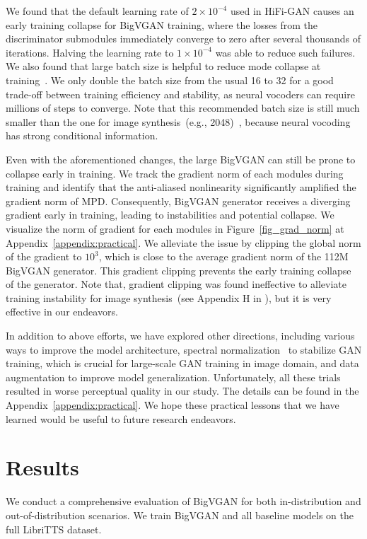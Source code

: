 \documentclass{article} \usepackage{iclr2023_conference,times}
\theoremstyle{plain}
\theoremstyle{definition}
\theoremstyle{remark}
\begin{document}
We found that the default learning rate of $2\times10^{-4}$ used in HiFi-GAN causes an early training collapse for BigVGAN training, where the losses from the discriminator submodules immediately converge to zero after several thousands of iterations. Halving the learning rate to $1\times10^{-4}$ was able to reduce such failures. 
We also found that large batch size is helpful to reduce mode collapse at training~\citep{brock2018large}. We only double the batch size from the usual 16 to 32 for a good trade-off between training efficiency and stability, as neural vocoders can require millions of steps to converge. Note that this recommended batch size is still much smaller than the one for image synthesis~(e.g., 2048)~\citep{brock2018large}, because neural vocoding has strong conditional information.

Even with the aforementioned changes, the large BigVGAN can still be prone to collapse early in training. We track the gradient norm of each modules during training and identify that the anti-aliased nonlinearity significantly amplified the gradient norm of MPD. Consequently, BigVGAN generator receives a diverging gradient early in training, leading to instabilities and potential collapse. We visualize the norm of gradient for each modules in Figure~\ref{fig_grad_norm} at Appendix~\ref{appendix:practical}. We alleviate the issue by clipping the global norm of the gradient to $10^{3}$, which is close to the average gradient norm of the 112M BigVGAN generator. This gradient clipping prevents the early training collapse of the generator. Note that, gradient clipping was found ineffective to alleviate training instability for image synthesis~(see Appendix H in \citet{brock2018large}), but it is very effective in our endeavors.


In addition to above efforts, we have explored other directions, including various ways to improve the model architecture,  spectral normalization~\citep{miyato2018spectral} to stabilize GAN training, which is crucial for large-scale GAN training in image domain, and data augmentation to improve model generalization. Unfortunately, all these trials resulted in worse perceptual quality in our study. The details can be found in the Appendix~\ref{appendix:practical}. We hope these practical lessons that we have learned would be useful to future research endeavors.



\vspace{-.2cm}
\section{Results}
\label{sec:results}
\vspace{-.2cm}
We conduct a comprehensive evaluation of BigVGAN for both in-distribution and out-of-distribution scenarios.
We train BigVGAN and all baseline models on the full LibriTTS dataset.
\end{document}
